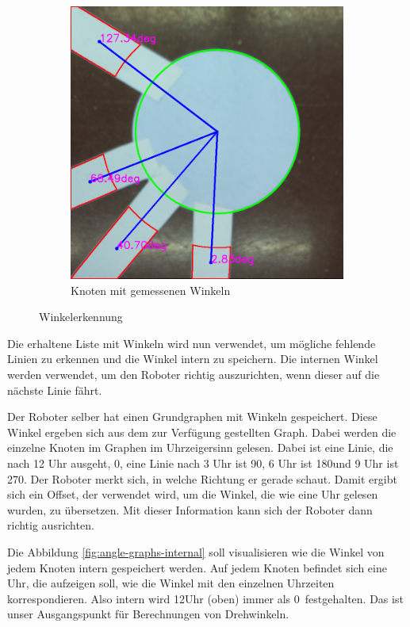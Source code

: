 \begin{figure}[H]
\begin{subfigure}{0.45\textwidth}
\includegraphics[width=0.95\linewidth]{assets/informatik-prototyp/opencv/angle_detection/node_with_edge_angles_annotated.png} 
\caption{Knoten mit gemessenen Winkeln}
\label{fig:node-angles}
\end{subfigure}

\caption{Winkelerkennung}
\label{fig:angle-recognition}
\end{figure}

Die erhaltene Liste mit Winkeln wird nun verwendet, um mögliche fehlende Linien zu erkennen und die Winkel intern zu speichern. Die internen Winkel werden verwendet, um den Roboter richtig auszurichten, wenn dieser auf die nächste Linie fährt.

Der Roboter selber hat einen Grundgraphen mit Winkeln gespeichert. Diese Winkel ergeben sich aus dem zur Verfügung gestellten Graph. Dabei werden die einzelne Knoten im Graphen im Uhrzeigersinn gelesen. Dabei ist eine Linie, die nach 12 Uhr ausgeht, 0\textdegree, eine Linie nach 3 Uhr ist 90\textdegree, 6 Uhr ist 180\textdegree und 9 Uhr ist 270\textdegree. Der Roboter merkt sich, in welche Richtung er gerade schaut. Damit ergibt sich ein Offset, der verwendet wird, um die Winkel, die wie eine Uhr gelesen wurden, zu übersetzen. Mit dieser Information kann sich der Roboter dann richtig ausrichten.

Die Abbildung \ref{fig:angle-graphs-internal} soll visualisieren wie die Winkel von jedem Knoten intern gespeichert werden. Auf jedem Knoten befindet sich eine Uhr, die aufzeigen soll, wie die Winkel mit den einzelnen Uhrzeiten korrespondieren. Also intern wird 12Uhr (oben) immer als 0\textdegree\ festgehalten. Das ist unser Ausgangspunkt für Berechnungen von Drehwinkeln.

